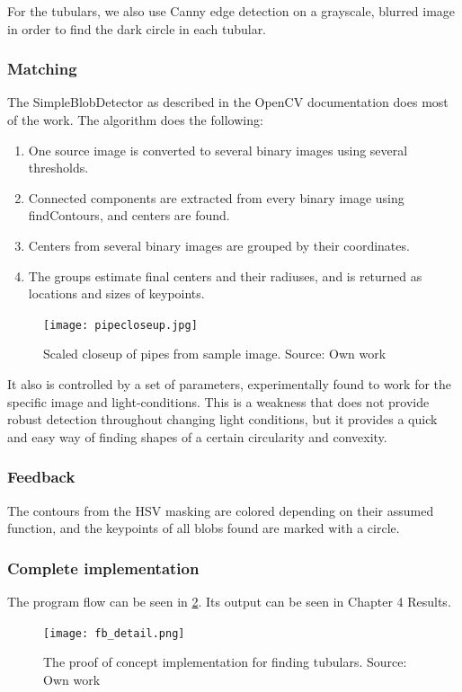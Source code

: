 For the tubulars, we also use Canny edge detection on a grayscale, blurred image in order to find the dark circle in each tubular.

\subsubsection{Matching}
The SimpleBlobDetector as described in the OpenCV documentation \citet{opencvdocs15} does most of the work. The algorithm does the following:

\begin{enumerate}
\item[1] One source image is converted to several binary images using several thresholds.
\item[2] Connected components are extracted from every binary image using findContours, and centers are found.
\item[3] Centers from several binary images are grouped by their coordinates.
\item[4] The groups estimate final centers and their radiuses, and is returned as locations and sizes of keypoints.
\end{enumerate}

\begin{figure}[ht]
    \centering
    \texttt{[image: pipecloseup.jpg]}
    \caption{Scaled closeup of pipes from sample image. Source: Own work}
    \label{fig:fb_detail}
\end{figure}
\FloatBarrier

It also is controlled by a set of parameters, experimentally found to work for the specific image and light-conditions. This is a weakness that does not provide robust detection throughout changing light conditions, but it provides a quick and easy way of finding shapes of a certain circularity and convexity.

\subsubsection{Feedback}
The contours from the HSV masking are colored depending on their assumed function, and the keypoints of all blobs found are marked with a circle.

\subsubsection{Complete implementation}
The program flow can be seen in \ref{fig:fb_detail}. Its output can be seen in Chapter 4 Results.

\begin{figure}[ht]
    \centering
    \texttt{[image: fb\_detail.png]}
    \caption{The proof of concept implementation for finding tubulars. Source: Own work}
    \label{fig:fb_detail}
\end{figure}
\FloatBarrier
